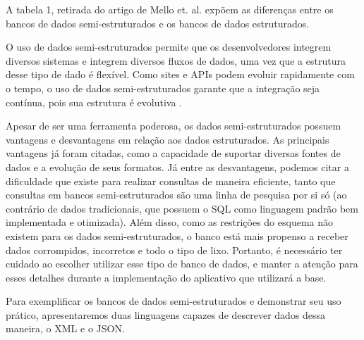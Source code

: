 A tabela 1, retirada do artigo de Mello et. al. \cite{dosdados} expõem as diferenças entre os bancos de dados semi-estruturados e os bancos de dados estruturados.


\begin{table}[]
\centering
{}
\caption{Diferenças entre dados tradicionais e dados semi-estruturados \cite{dosdados}.}
\label{tab:my-table}
\end{table}

O uso de dados semi-estruturados permite que os desenvolvedores integrem diversos sistemas e integrem diversos fluxos de dados, uma vez que a estrutura desse tipo de dado é flexível. Como sites e APIs podem evoluir rapidamente com o tempo, o uso de dados semi-estruturados garante que a integração seja contínua, pois sua estrutura é evolutiva \cite{treehouse}.

Apesar de ser uma ferramenta poderosa, os dados semi-estruturados possuem vantagens e desvantagens em relação aos dados estruturados. As principais vantagens já foram citadas, como a capacidade de suportar diversas fontes de dados e a evolução de seus formatos. Já entre as desvantagens, podemos citar a dificuldade que existe para realizar consultas de maneira eficiente, tanto que consultas em bancos semi-estruturados são uma linha de pesquisa por si só (ao contrário de dados tradicionais, que possuem o SQL como linguagem padrão bem implementada e otimizada). Além disso, como as restrições do esquema não existem para os dados semi-estruturados, o banco está mais propenso a receber dados corrompidos, incorretos e todo o tipo de lixo. Portanto, é necessário ter cuidado ao escolher utilizar esse tipo de banco de dados, e manter a atenção para esses detalhes durante a implementação do aplicativo que utilizará a base.

Para exemplificar os bancos de dados semi-estruturados e demonstrar seu uso prático, apresentaremos duas linguagens capazes de descrever dados dessa maneira, o XML e o JSON.
